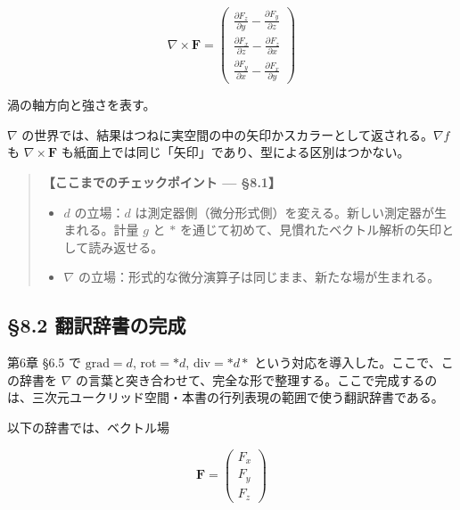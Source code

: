 \documentclass[a4paper,12pt,openany]{book}
\begin{document}
\[\nabla \times \mathbf{F} = \begin{pmatrix} \frac{\partial F_z}{\partial y} - \frac{\partial F_y}{\partial z} \\[0.3em] \frac{\partial F_x}{\partial z} - \frac{\partial F_z}{\partial x} \\[0.3em] \frac{\partial F_y}{\partial x} - \frac{\partial F_x}{\partial y} \end{pmatrix}\]

渦の軸方向と強さを表す。

\(\nabla\)
の世界では、結果はつねに実空間の中の矢印かスカラーとして返される。\(\nabla f\)
も \(\nabla\times\mathbf{F}\)
も紙面上では同じ「矢印」であり、型による区別はつかない。

\begin{quote}
\textbf{【ここまでのチェックポイント — §8.1】}

\begin{itemize}
\item
  \(d\) の立場：\(d\)
  は測定器側（微分形式側）を変える。新しい測定器が生まれる。計量 \(g\)
  と \(\ast\)
  を通じて初めて、見慣れたベクトル解析の矢印として読み返せる。
\item
  \(\nabla\) の立場：形式的な微分演算子は同じまま、新たな場が生まれる。
\end{itemize}
\end{quote}

\par\vspace{0.35em}\par

\hypertarget{ux7ffbux8a33ux8f9eux66f8ux306eux5b8cux6210}{%
\subsection{§8.2
翻訳辞書の完成}\label{ux7ffbux8a33ux8f9eux66f8ux306eux5b8cux6210}}

第6章 §6.5 で \(\mathrm{grad}=d\), \(\mathrm{rot}=\ast d\),
\(\mathrm{div}=\ast d\ast\) という対応を導入した。ここで、この辞書を
\(\nabla\)
の言葉と突き合わせて、完全な形で整理する。ここで完成するのは、三次元ユークリッド空間・本書の行列表現の範囲で使う翻訳辞書である。

以下の辞書では、ベクトル場

\[
\mathbf{F}
=
\begin{pmatrix}
F_x\\
F_y\\
F_z
\end{pmatrix}
\]
\end{document}
